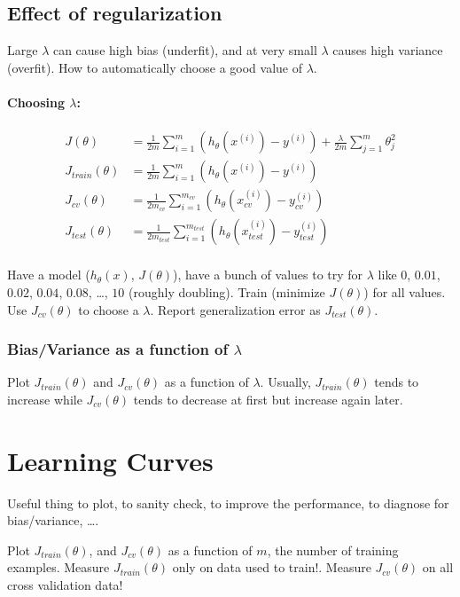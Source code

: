 \subsection{Effect of regularization}
Large $\lambda$ can cause high bias (underfit), and at very small $\lambda$ causes
high variance (overfit). How to automatically choose a good value of $\lambda$.

\paragraph{Choosing $\lambda$:}
\begin{align*}
	J(\theta)         & = \frac{1}{2m}\sum_{i=1}^m(h_\theta(x^{(i)}) - y^{(i)}) +
	\frac{\lambda}{2m}\sum_{j=1}^m\theta_j^2                                      \\
	J_{train}(\theta) & = \frac{1}{2m}\sum_{i=1}^m(h_\theta(x^{(i)}) - y^{(i)})   \\
	J_{cv}(\theta)    & = \frac{1}{2m_{cv}}
	\sum_{i=1}^{m_{cv}}(h_\theta(x_{cv}^{(i)}) - y_{cv}^{(i)})                    \\
	J_{test}(\theta)  & = \frac{1}{2m_{test}}
	\sum_{i=1}^{m_{test}}(h_\theta(x_{test}^{(i)}) - y_{test}^{(i)})              \\
\end{align*}

Have a model ($h_\theta(x)$, $J(\theta)$), have a bunch of values to try for $\lambda$ like $0$,
$0.01$, $0.02$, $0.04$, $0.08$, \dots, $10$ (roughly doubling). Train (minimize $J(\theta)$)
for all values. Use $J_{cv}(\theta)$ to choose a $\lambda$. Report generalization error as
$J_{test}(\theta)$.

\subsubsection{Bias/Variance as a function of $\lambda$}
Plot $J_{train}(\theta)$ and $J_{cv}(\theta)$ as a function of $\lambda$. Usually,
$J_{train}(\theta)$ tends to increase while $J_{cv}(\theta)$ tends to decrease at
first but increase again later.

\section{Learning Curves}
Useful thing to plot, to sanity check, to improve the performance, to diagnose for
bias/variance, \dots.

Plot $J_{train}(\theta)$, and $J_{cv}(\theta)$ as a function of $m$, the number of
training examples. Measure $J_{train}(\theta)$ only on data used to train!. Measure
$J_{cv}(\theta)$ on all cross validation data!

